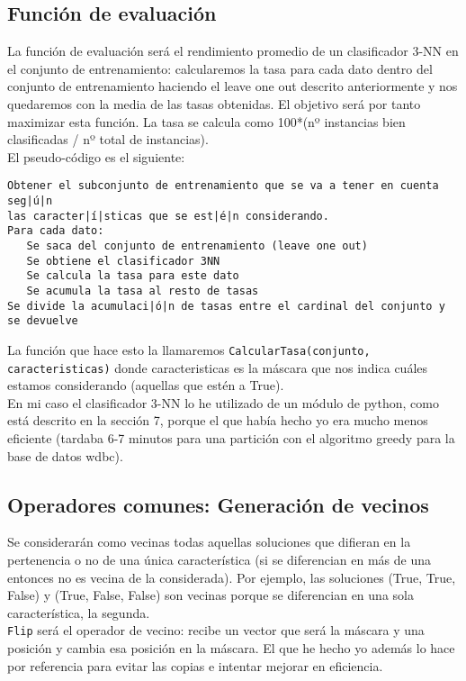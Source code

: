 \documentclass[12pt]{article}
\begin{document}
\subsection{Función de evaluación}
La función de evaluación será el rendimiento promedio de un clasificador 3-NN en el conjunto de entrenamiento: calcularemos la tasa para cada dato dentro del conjunto de entrenamiento haciendo el leave one out descrito anteriormente y nos quedaremos con la media de las tasas obtenidas. El objetivo será por tanto maximizar esta función.
La tasa se calcula como 100*(nº instancias bien clasificadas / nº total de instancias).\\

El pseudo-código es el siguiente:\\
\begin{lstlisting}
Obtener el subconjunto de entrenamiento que se va a tener en cuenta seg|ú|n 
las caracter|í|sticas que se est|é|n considerando.
Para cada dato:
   Se saca del conjunto de entrenamiento (leave one out)
   Se obtiene el clasificador 3NN
   Se calcula la tasa para este dato
   Se acumula la tasa al resto de tasas
Se divide la acumulaci|ó|n de tasas entre el cardinal del conjunto y se devuelve
\end{lstlisting}
La función que hace esto la llamaremos \texttt{CalcularTasa(conjunto, caracteristicas)} donde caracteristicas es la máscara que nos indica cuáles estamos considerando (aquellas que estén a True).\\

En mi caso el clasificador 3-NN lo he utilizado de un módulo de python, como está descrito en la sección 7, porque el que había hecho yo era mucho menos eficiente (tardaba 6-7 minutos para una partición con el algoritmo greedy para la base de datos wdbc).

\subsection{Operadores comunes: Generación de vecinos}
Se considerarán como vecinas todas aquellas soluciones que difieran en la pertenencia o no de una única característica (si se diferencian en más de una entonces no es vecina de la considerada). Por ejemplo, las soluciones (True, True, False) y (True, False, False) son vecinas porque se diferencian en una sola característica, la segunda.\\
\texttt{Flip} será el operador de vecino: recibe un vector que será la máscara y una posición y cambia esa posición en la máscara. El que he hecho yo además lo hace por referencia para evitar las copias e intentar mejorar en eficiencia.\\
\end{document}
